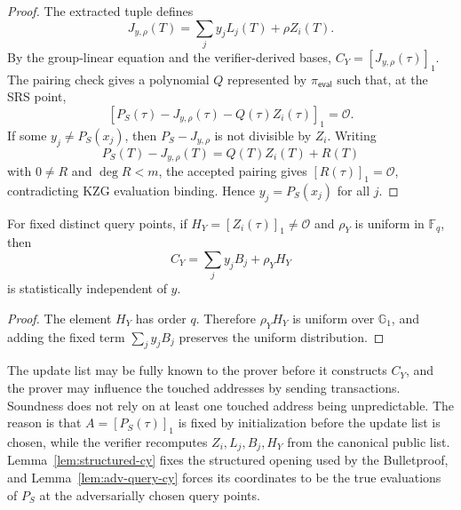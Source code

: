 \documentclass[runningheads]{llncs}
\newcommand{\F}{\mathbb{F}}
\newcommand{\G}{\mathbb{G}}
\begin{document}
\begin{proof}
The extracted tuple defines
\[
        J_{y,\rho}(T)=\sum_j y_jL_j(T)+\rho Z_i(T).
\]
By the group-linear equation and the verifier-derived bases, \(C_Y=[J_{y,\rho}(\tau)]_1\).  The pairing check gives a polynomial \(Q\) represented by \(\pi_{\mathsf{eval}}\) such that, at the SRS point,
\[
        [P_S(\tau)-J_{y,\rho}(\tau)-Q(\tau)Z_i(\tau)]_1=\mathcal O .
\]
If some \(y_j\ne P_S(x_j)\), then \(P_S-J_{y,\rho}\) is not divisible by \(Z_i\).  Writing
\[
        P_S(T)-J_{y,\rho}(T)=Q(T)Z_i(T)+R(T)
\]
with \(0\ne R\) and \(\deg R<m\), the accepted pairing gives \([R(\tau)]_1=\mathcal O\), contradicting KZG evaluation binding.  Hence \(y_j=P_S(x_j)\) for all \(j\).
\end{proof}

\begin{lemma}\label{lem:cy-hiding}
For fixed distinct query points, if \(H_Y=[Z_i(\tau)]_1\ne\mathcal O\) and \(\rho_Y\) is uniform in \(\F_q\), then
\[
        C_Y=\sum_j y_jB_j+\rho_YH_Y
\]
is statistically independent of \(y\).
\end{lemma}

\begin{proof}
The element \(H_Y\) has order \(q\).  Therefore \(\rho_YH_Y\) is uniform over \(\G_1\), and adding the fixed term \(\sum_jy_jB_j\) preserves the uniform distribution.
\end{proof}

\begin{remarkx}
The update list may be fully known to the prover before it constructs \(C_Y\), and the prover may influence the touched addresses by sending transactions.  Soundness does not rely on at least one touched address being unpredictable.  The reason is that \(A=[P_S(\tau)]_1\) is fixed by initialization before the update list is chosen, while the verifier recomputes \(Z_i,L_j,B_j,H_Y\) from the canonical public list.  Lemma~\ref{lem:structured-cy} fixes the structured opening used by the Bulletproof, and Lemma~\ref{lem:adv-query-cy} forces its coordinates to be the true evaluations of \(P_S\) at the adversarially chosen query points.
\end{remarkx}
\end{document}
